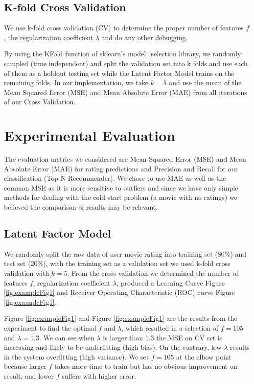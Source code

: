 \documentclass[12pt]{article}
\begin{document}
\subsection{K-fold Cross Validation}
We use k-fold cross validation (CV) to determine the proper number of features $f$, the regularization coefficient $\lambda$ and do any other debugging.

By using the KFold function of sklearn's model\_selection library, we randomly sampled (time independent) and split the validation set into k folds and use each of them as a holdout testing set while the Latent Factor Model trains on the remaining folds. In our implementation, we take $k=5$ and use the mean of the Mean Squared Error (MSE) and Mean Absolute Error (MAE) from all iterations of our Cross Validation.

\section{Experimental Evaluation}
The evaluation metrics we considered are Mean Squared Error (MSE) and Mean Absolute Error (MAE) for rating predictions and Precision and Recall for our classification (Top N Recommender). We chose to use MAE as well as the common MSE as it is more sensitive to outliers and since we have only simple methods for dealing with the cold start problem (a movie with no ratings) we believed the comparison of results may be relevant.

\subsection{Latent Factor Model}
We randomly split the raw data of user-movie rating into training set (80\%) and test set (20\%), with the training set as a validation set we used k-fold cross validation with $k=5$. From the cross validation we determined the number of features $f$, regularization coefficient $\lambda$, produced a Learning Curve Figure \ref{fig:exampleFig1} and Receiver Operating Characteristic (ROC) curve Figure \ref{fig:exampleFig1}. 

Figure \ref{fig:exampleFig1} and Figure \ref{fig:exampleFig1} are the results from the experiment to find the optimal $f$ and $\lambda$, which resulted in a selection of $f=105$ and $\lambda = 1.3$. We can see when $\lambda$ is larger than 1.3 the MSE on CV set is increasing and likely to be underfitting (high bias). On the contrary, low $\lambda$ results in the system overfitting (high variance). We set $f=105$ at the elbow point because larger $f$ takes more time to train but has no obvious improvement on result, and lower $f$ suffers with higher error.
\end{document}
